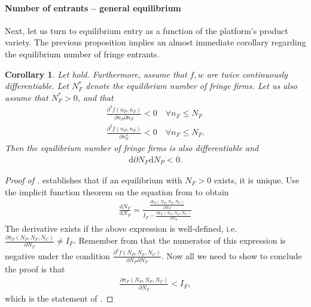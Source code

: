 \documentclass[a4paper]{article}
\newtheorem{corollary}{Corollary}
\newcommand{\dd}{\mathrm{d}}
\begin{document}
\paragraph{Number of entrants -- general equilibrium}
Next, let us turn to equilibrium entry as a function of the platform's product variety.
The previous proposition implies an almost immediate corollary regarding the equilibrium number of fringe entrants.
\begin{corollary}
    \label{cor:fringe_entry}
    Let  hold.
    Furthermore, assume that $f, w$ are twice continuously differentiable.
    Let $N_F^*$ denote the equilibrium number of fringe firms.
    Let us also assume that $N_F^* > 0$, and that
    \begin{align*}
        \frac{\partial^2 f(n_P, n_F)}{\partial n_P \partial n_F} < 0 \quad \forall n_F \leq N_F \\
        \frac{\partial^2 f(n_P, n_F)}{\partial n_F^2} < 0 \quad \forall n_F \leq N_F.
    \end{align*}
    Then the equilibrium number of fringe firms is also differentiable and
    \begin{align*}
        \dd{\partial N_F}{\dd N_P} < 0.
    \end{align*}
\end{corollary}
\begin{proof}[Proof of ]
     establishes that if an equilibrium with $N_F > 0$ exists, it is unique.
    Use the implicit function theorem on the equation from  to obtain
    \begin{align*}
        \frac{\dd N_F}{\dd N_P} = \frac{\frac{\partial \pi_F(N_P, N_F, N_C)}{\partial N_P}}{I_F - \frac{\partial \pi_F (N_P, N_F, N_C)}{\partial N_F}}
    \end{align*}
    The derivative exists if the above expression is well-defined, i.e. $\frac{\partial \pi_F (N_P, N_F, N_C)}{\partial N_F} \neq I_F$.
    Remember from  that the numerator of this expression is negative under the condition $\frac{\partial^2 f(N_P, N_F, N_C)}{\partial N_P \partial N_F}$.
    Now all we need to show to conclude the proof is that
    \begin{align*}
        \frac{\partial \pi_F (N_P, N_F, N_C)}{\partial N_F} < I_F,
    \end{align*}
    which is the statement of .
\end{proof}
\end{document}
